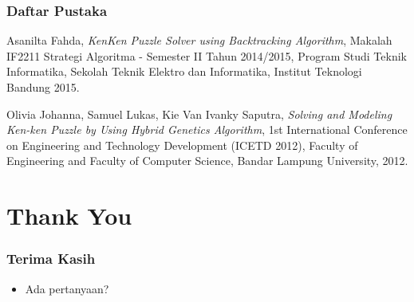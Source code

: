 \documentclass{beamer}
\begin{document}
\begin{frame}
\frametitle{Daftar Pustaka}
\begin{thebibliography}{9}
  Asanilta Fahda,
  \emph{KenKen Puzzle Solver using Backtracking Algorithm},
  Makalah IF2211 Strategi Algoritma - Semester II Tahun 2014/2015,
  Program Studi Teknik Informatika, Sekolah Teknik Elektro dan Informatika, Institut Teknologi Bandung
  2015.

  Olivia Johanna, Samuel Lukas, Kie Van Ivanky Saputra,
  \emph{Solving and Modeling Ken-ken Puzzle by Using Hybrid Genetics Algorithm},
  1st International Conference on Engineering and Technology Development (ICETD 2012),
  Faculty of Engineering and Faculty of Computer Science, Bandar Lampung University,
  2012.
\end{thebibliography}
\end{frame}

\section{Thank You}

\begin{frame}
\frametitle{Terima Kasih}
\begin{itemize}
\item Ada pertanyaan?
\end{itemize}
\end{frame}

\note{

}
\end{document}
